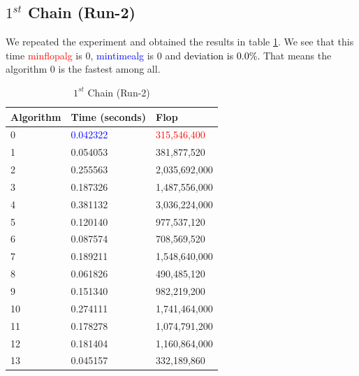 \documentclass[10pts]{article}
\begin{document}
\subsection*{$1^{st}$ Chain (Run-2)  }
We repeated the experiment and obtained the results in table \ref{table:$1^{st}$ Chain (Run-2)}. We see that this time \textcolor{red}{min\textunderscore flop\textunderscore alg} is $0$, \textcolor{blue}{min\textunderscore time\textunderscore alg} is $0$ and  \textcolor{black}{deviation is 0.0\%}. That means the algorithm 0 is the fastest among all. 
 \begin{table}[htp!]
 	\centering
 	\begin{center}
 	\begin{tabular}{| l | l | l |}
 		\hline
 		\textbf{Algorithm}  & \textbf{Time} (seconds) & \textbf{Flop}\\
 		\hline
 		0 	&	\textcolor{blue}{0.042322} 	&	\textcolor{red}{315,546,400} \\			
 		1 	&	0.054053 	&	381,877,520 	\\	
 		2 	&	0.255563 	&	2,035,692,000 	\\	
 		3 	&	0.187326 	&	1,487,556,000 	\\		
 		4 	&	0.381132 	&	3,036,224,000 	\\		
 		5 	&	0.120140 	&	977,537,120 	\\		
 		6 	&	0.087574 	&	708,569,520 	\\		
 		7 	&	0.189211 	&	1,548,640,000 	\\		
 		8 	&	0.061826 	&	490,485,120 	\\		
 		9 	&	0.151340 	&	982,219,200 	\\		
 		10 	&	0.274111 	&	1,741,464,000 	\\		
 		11 	&	0.178278 	&	1,074,791,200 	\\		
 		12 	&	0.181404 	&	1,160,864,000 	\\		
 		13 	&	0.045157 	&	332,189,860	\\
 		\hline
 	\end{tabular}		
 	\end{center}
 	\caption{$1^{st}$ Chain (Run-2)}
 	\label{table:$1^{st}$ Chain (Run-2)}
 \end{table}
\end{document}
